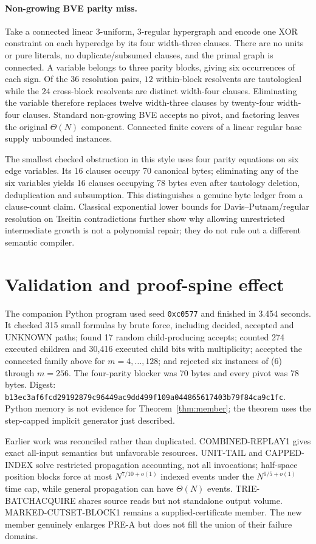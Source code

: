 \documentclass[11pt]{article}
\begin{document}
\paragraph{Non-growing BVE parity miss.}
Take a connected linear 3-uniform, 3-regular hypergraph and encode one XOR
constraint on each hyperedge by its four width-three clauses.  There are no
units or pure literals, no duplicate/subsumed clauses, and the primal graph is
connected.  A variable belongs to three parity blocks, giving six occurrences
of each sign.  Of the $36$ resolution pairs, $12$ within-block resolvents are
tautological while the $24$ cross-block resolvents are distinct width-four
clauses.  Eliminating the variable therefore replaces twelve width-three
clauses by twenty-four width-four clauses.  Standard non-growing BVE accepts
no pivot, and factoring leaves the original $\Theta(N)$ component.  Connected
finite covers of a linear regular base supply unbounded instances.

The smallest checked obstruction in this style uses four parity equations
on six edge variables.  Its 16 clauses occupy 70 canonical bytes; eliminating
any of the six variables yields 16 clauses occupying 78 bytes even after
tautology deletion, deduplication and subsumption.  This distinguishes a
genuine byte ledger from a clause-count claim.  Classical exponential lower
bounds for Davis--Putnam/regular resolution on Tseitin contradictions further
show why allowing unrestricted intermediate growth is not a polynomial
repair; they do not rule out a different semantic compiler.

\section{Validation and proof-spine effect}

The companion Python program used seed \texttt{0xc0577} and finished in
3.454 seconds.  It checked 315 small formulas by brute force, including
decided, accepted and UNKNOWN paths; found 17 random child-producing accepts;
counted 274 executed children and 30,416 executed child bits with
multiplicity; accepted the connected family above for $m=4,\ldots,128$; and
rejected six instances of (6) through $m=256$.  The four-parity blocker was
70 bytes and every pivot was 78 bytes.  Digest:
\texttt{b13ec3af6fcd29192879c96449ac9dd499f109a044865617403b79f84ca9c1fc}.
Python memory is not evidence for Theorem~\ref{thm:member}; the theorem uses
the step-capped implicit generator just described.

Earlier work was reconciled rather than duplicated.  COMBINED-REPLAY1 gives
exact all-input semantics but unfavorable resources.  UNIT-TAIL and
CAPPED-INDEX solve restricted propagation accounting, not all invocations;
half-space position blocks force at most $N^{7/10+o(1)}$ indexed events under
the $N^{6/5+o(1)}$ time cap, while general propagation can have $\Theta(N)$
events.  TRIE-BATCHACQUIRE shares source reads but not standalone output
volume.  MARKED-CUTSET-BLOCK1 remains a supplied-certificate member.  The new
member genuinely enlarges PRE-A but does not fill the union of their failure
domains.
\end{document}
